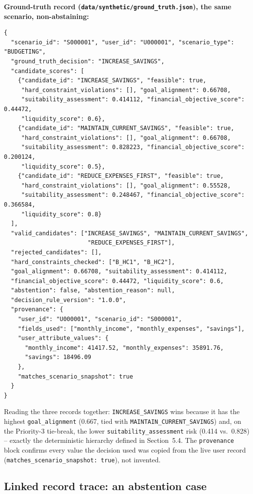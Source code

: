 \documentclass[12pt,a4paper]{article}
\begin{document}
\textbf{Ground-truth record (\texttt{data/synthetic/ground\_truth.json}), the same scenario, non-abstaining:}
{\scriptsize
\begin{verbatim}
{
  "scenario_id": "S000001", "user_id": "U000001", "scenario_type": "BUDGETING",
  "ground_truth_decision": "INCREASE_SAVINGS",
  "candidate_scores": [
    {"candidate_id": "INCREASE_SAVINGS", "feasible": true,
     "hard_constraint_violations": [], "goal_alignment": 0.66708,
     "suitability_assessment": 0.414112, "financial_objective_score": 0.44472,
     "liquidity_score": 0.6},
    {"candidate_id": "MAINTAIN_CURRENT_SAVINGS", "feasible": true,
     "hard_constraint_violations": [], "goal_alignment": 0.66708,
     "suitability_assessment": 0.828223, "financial_objective_score": 0.200124,
     "liquidity_score": 0.5},
    {"candidate_id": "REDUCE_EXPENSES_FIRST", "feasible": true,
     "hard_constraint_violations": [], "goal_alignment": 0.55528,
     "suitability_assessment": 0.248467, "financial_objective_score": 0.366584,
     "liquidity_score": 0.8}
  ],
  "valid_candidates": ["INCREASE_SAVINGS", "MAINTAIN_CURRENT_SAVINGS",
                        "REDUCE_EXPENSES_FIRST"],
  "rejected_candidates": [],
  "hard_constraints_checked": ["B_HC1", "B_HC2"],
  "goal_alignment": 0.66708, "suitability_assessment": 0.414112,
  "financial_objective_score": 0.44472, "liquidity_score": 0.6,
  "abstention": false, "abstention_reason": null,
  "decision_rule_version": "1.0.0",
  "provenance": {
    "user_id": "U000001", "scenario_id": "S000001",
    "fields_used": ["monthly_income", "monthly_expenses", "savings"],
    "user_attribute_values": {
      "monthly_income": 41417.52, "monthly_expenses": 35891.76,
      "savings": 18496.09
    },
    "matches_scenario_snapshot": true
  }
}
\end{verbatim}
}

Reading the three records together: \texttt{INCREASE\_SAVINGS} wins because it has the highest \texttt{goal\_alignment} (0.667, tied with \texttt{MAINTAIN\_CURRENT\_SAVINGS}) and, on the Priority-3 tie-break, the lower \texttt{suitability\_assessment} risk (0.414 vs.\ 0.828) -- exactly the deterministic hierarchy defined in Section~5.4. The \texttt{provenance} block confirms every value the decision used was copied from the live user record (\texttt{matches\_scenario\_snapshot: true}), not invented.

\subsection{Linked record trace: an abstention case}
\end{document}
